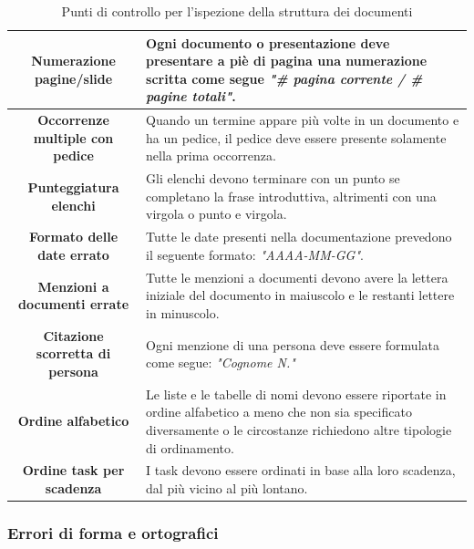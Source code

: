 \begin{table}[H]
\begin{xltabular}{\textwidth}{c|X}
\hline
\textbf{Numerazione pagine/slide} & Ogni documento o presentazione deve presentare a piè di pagina una numerazione scritta come segue \textit{"\# pagina corrente / \# pagine totali"}.\\
\hline
\textbf{Occorrenze multiple con pedice} & Quando un termine appare più volte in un documento e ha un pedice, il pedice deve essere presente solamente nella prima occorrenza.\\
\hline
\textbf{Punteggiatura elenchi} & Gli elenchi devono terminare con un punto se completano la frase introduttiva, altrimenti con una virgola o punto e virgola.\\
\hline
\textbf{Formato delle date errato} & Tutte le date presenti nella documentazione prevedono il seguente formato: \textit{"AAAA-MM-GG"}.\\
\hline
\textbf{Menzioni a documenti errate} & Tutte le menzioni a documenti devono avere la lettera iniziale del documento in maiuscolo e le restanti lettere in minuscolo.\\
\hline
\textbf{Citazione scorretta di persona }& Ogni menzione di una persona deve essere formulata come segue: \textit{"Cognome N."} \\
\hline
\textbf{Ordine alfabetico} & Le liste e le tabelle di nomi devono essere riportate in ordine alfabetico a meno che non sia specificato diversamente o le circostanze richiedono altre tipologie di ordinamento.\\
\hline
\textbf{Ordine task per scadenza} & I task devono essere ordinati in base alla loro scadenza, dal più vicino al più lontano.\\

\end{xltabular}
\caption{Punti di controllo per l'ispezione della struttura dei documenti}
\end{table}


\subsubsection{Errori di forma e ortografici}

